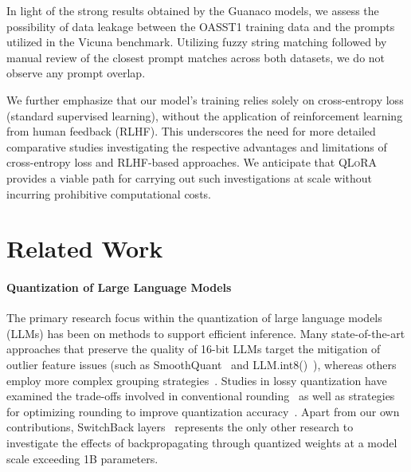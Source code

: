 In light of the strong results obtained by the {Guanaco} models, we assess the possibility of data leakage between the OASST1 training data and the prompts utilized in the Vicuna benchmark. Utilizing fuzzy string matching followed by manual review of the closest prompt matches across both datasets, we do not observe any prompt overlap.

We further emphasize that our model's training relies solely on cross-entropy loss (standard supervised learning), without the application of reinforcement learning from human feedback (RLHF). This underscores the need for more detailed comparative studies investigating the respective advantages and limitations of cross-entropy loss and RLHF-based approaches. We anticipate that \textsc{QLoRA} provides a viable path for carrying out such investigations at scale without incurring prohibitive computational costs.

\section{Related Work}

\paragraph{Quantization of Large Language Models} The primary research focus within the quantization of large language models (LLMs) has been on methods to support efficient inference. Many state-of-the-art approaches that preserve the quality of 16-bit LLMs target the mitigation of outlier feature issues (such as SmoothQuant~\citep{xiao2022smoothquant} and LLM.int8()~\citep{dettmers2022llm}), whereas others employ more complex grouping strategies~\citep{park2022nuqmm, yao2022zeroquant}. Studies in lossy quantization have examined the trade-offs involved in conventional rounding~\citep{dettmers2022case,zeng2022glm,pope2022efficiently} as well as strategies for optimizing rounding to improve quantization accuracy~\citep{frantar2022gptq}. Apart from our own contributions, SwitchBack layers~\citep{wortsman2023stable} represents the only other research to investigate the effects of backpropagating through quantized weights at a model scale exceeding 1B parameters.

